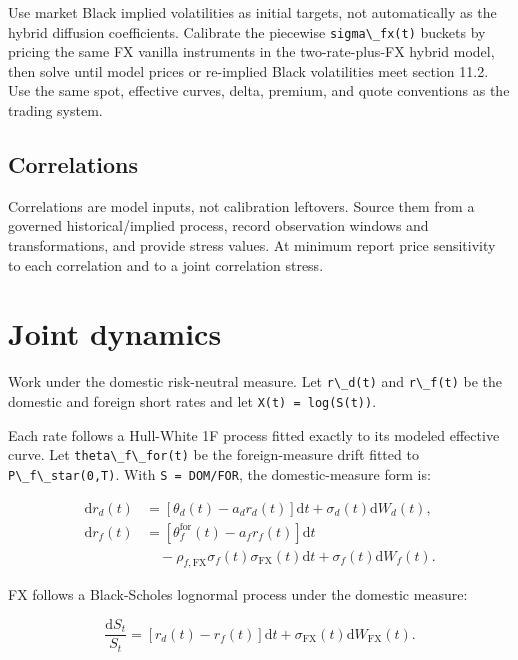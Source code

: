 \documentclass[conference]{IEEEtran}
\newcommand{\passthrough}[1]{#1}
\begin{document}
Use market Black implied volatilities as initial targets, not
automatically as the hybrid diffusion coefficients. Calibrate the
piecewise \passthrough{\lstinline!sigma\_fx(t)!} buckets by pricing the
same FX vanilla instruments in the two-rate-plus-FX hybrid model, then
solve until model prices or re-implied Black volatilities meet section
11.2. Use the same spot, effective curves, delta, premium, and quote
conventions as the trading system.

\subsection{Correlations}\label{54-correlations}

Correlations are model inputs, not calibration leftovers. Source them
from a governed historical/implied process, record observation windows
and transformations, and provide stress values. At minimum report price
sensitivity to each correlation and to a joint correlation stress.

\section{Joint dynamics}\label{6-joint-dynamics}

Work under the domestic risk-neutral measure. Let
\passthrough{\lstinline!r\_d(t)!} and \passthrough{\lstinline!r\_f(t)!}
be the domestic and foreign short rates and let
\passthrough{\lstinline!X(t) = log(S(t))!}.

Each rate follows a Hull-White 1F process fitted exactly to its modeled
effective curve. Let \passthrough{\lstinline!theta\_f\_for(t)!} be the
foreign-measure drift fitted to
\passthrough{\lstinline!P\_f\_star(0,T)!}. With
\passthrough{\lstinline!S = DOM/FOR!}, the domestic-measure form is:

\begin{align*}
  \mathrm{d}r_d(t)
    &= \left[\theta_d(t)-a_dr_d(t)\right]\mathrm{d}t
       +\sigma_d(t)\mathrm{d}W_d(t), \\
  \mathrm{d}r_f(t)
    &= \left[\theta_f^{\mathrm{for}}(t)-a_fr_f(t)\right]\mathrm{d}t \\
    &\quad-\rho_{f,\mathrm{FX}}\sigma_f(t)\sigma_{\mathrm{FX}}(t)\mathrm{d}t
       +\sigma_f(t)\mathrm{d}W_f(t).
\end{align*}

FX follows a Black-Scholes lognormal process under the domestic measure:

\begin{equation*}
  \frac{\mathrm{d}S_t}{S_t}
    = \left[r_d(t)-r_f(t)\right]\mathrm{d}t
      +\sigma_{\mathrm{FX}}(t)\mathrm{d}W_{\mathrm{FX}}(t).
\end{equation*}
\end{document}
